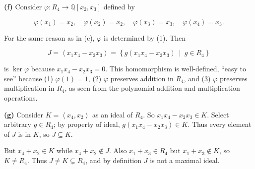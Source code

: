 \textbf{(f)} Consider \(\varphi:R_{4}\rightarrow\mathbb{Q}\left\lbrack {x_{2},x_{3}} \right\rbrack\) defined by

\[\varphi\left( x_{1} \right) = x_{2},\quad\varphi\left( x_{2} \right) = x_{2},\quad\varphi\left( x_{3} \right) = x_{3},\quad\varphi\left( x_{4} \right) = x_{3}.\]

For the same reason as in (c), \(\varphi\) is determined by (1). Then

\[J = \left\langle {x_{1}x_{4} - x_{2}x_{3}} \right\rangle = \left\{ g\left( {x_{1}x_{4} - x_{2}x_{3}} \right)\  \middle| \ g \in R_{4} \right\}\]

is \(\ker\varphi\) because \(x_{1}x_{4} - x_{2}x_{3} = 0\). This homomorphism is well-defined, ``easy to see'' because (1) \(\varphi(1) = 1\), (2) \(\varphi\) preserves addition in \(R_{4}\), and (3) \(\varphi\) preserves multiplication in \(R_{4}\), as seen from the polynomial addition and multiplication operations.

\textbf{(g)} Consider \(K = \left\langle {x_{4},x_{2}} \right\rangle\) as an ideal of \(R_{4}\). So \(x_{1}x_{4} - x_{2}x_{3} \in K\). Select arbitrary \(g \in R_{4}\); by property of ideal, \(g\left( {x_{1}x_{4} - x_{2}x_{3}} \right) \in K\). Thus every element of \(J\) is in \(K\), so \(J \subseteq K\).

But \(x_{4} + x_{2} \in K\) while \(x_{4} + x_{2} \notin J\). Also \(x_{1} + x_{3} \in R_{4}\) but \(x_{1} + x_{3} \notin K\), so \(K \neq R_{4}\). Thus \(J \neq K \subsetneq R_{4}\), and by definition \(J\) is not a maximal ideal.
